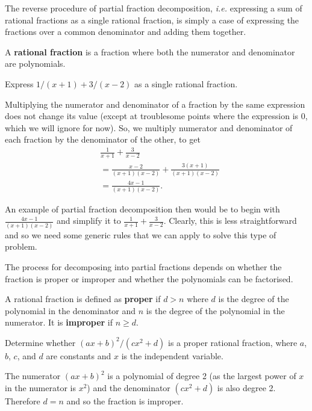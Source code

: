 The reverse procedure of partial fraction decomposition, \emph{i.e.} expressing a sum of rational fractions as a single rational fraction, is simply a case of expressing the fractions over a common denominator and adding them together. 

\begin{definition}
    A \textbf{rational fraction} is a fraction where both the numerator and denominator are polynomials.
\end{definition}

\begin{example}
    Express $1/(x+1) + 3/(x-2)$ as a single rational fraction.
\end{example}
\begin{solution}
Multiplying the numerator and denominator of a fraction by the same expression does not change its value (except at troublesome points where the expression is 0, which we will ignore for now). So, we multiply numerator and denominator of each fraction by the denominator of the other, to get 
\begin{align*}
    &\frac{1}{x+1} + \frac{3}{x-2}\\
    &=\frac{x-2}{(x+1)(x-2)} + \frac{3(x+1)}{(x+1)(x-2)}\\
    &= \frac{4x-1}{(x+1)(x-2)}.
\end{align*}
\end{solution}

An example of partial fraction decomposition then would be to begin with $\frac{4x-1}{(x+1)(x-2)}$ and simplify it to $\frac{1}{x+1} + \frac{3}{x-2}$. Clearly, this is less straightforward and so we need some generic rules that we can apply to solve this type of problem.

The process for decomposing into partial fractions depends on whether the fraction is proper or improper and whether the polynomials can be factorised.   

\begin{definition}
A rational fraction is defined as \textbf{proper} if $d > n$ where $d$ is the degree of the polynomial in the denominator and $n$ is the degree of the polynomial in the numerator. It is \textbf{improper} if $n \geq d$. 
\end{definition}

\begin{example}
    Determine whether $(ax + b)^2/(cx^2 + d)$ is a proper rational fraction, where $a$, $b$, $c$, and $d$ are constants and $x$ is the independent variable.
\end{example}
\begin{solution}
The numerator $(ax + b)^2$ is a polynomial of degree 2 (as the largest power of $x$ in the numerator is $x^2$) and the denominator $(cx^2 + d)$ is also degree 2. Therefore $d = n$ and so the fraction is improper.\\
\end{solution}

